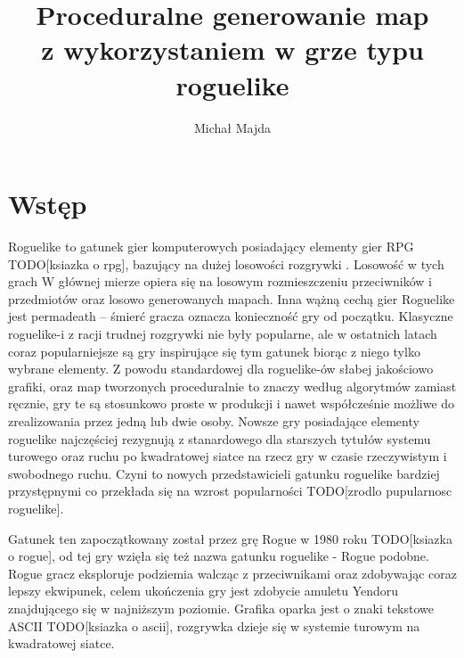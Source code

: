 \documentclass[12pt,twoside]{article}
\author{Michał Majda}
\title{Proceduralne generowanie map \\ z wykorzystaniem w grze typu roguelike }
\begin{document}
\maketitle

\blankpage
\tableofcontents
\clearpage
\blankpage


%

\section*{Wstęp}
Roguelike to gatunek gier komputerowych posiadający elementy gier RPG TODO[ksiazka o rpg], bazujący na dużej losowości rozgrywki \cite{bookroguelike}. Losowość w tych grach W głównej mierze opiera się na losowym rozmieszczeniu przeciwników i przedmiotów oraz losowo generowanych mapach. Inna wążną cechą gier Roguelike jest permadeath -- śmierć gracza oznacza konieczność gry od początku. Klasyczne roguelike-i z racji trudnej rozgrywki nie były popularne, ale w ostatnich latach coraz popularniejsze są gry inspirujące się tym gatunek biorąc z niego tylko wybrane elementy. Z powodu standardowej dla roguelike-ów słabej jakościowo grafiki, oraz map tworzonych proceduralnie to znaczy według algorytmów zamiast ręcznie, gry te są stosunkowo proste w produkcji i nawet współcześnie możliwe do zrealizowania przez jedną lub dwie osoby. Nowsze gry posiadające elementy roguelike najczęściej rezygnują z stanardowego dla starszych tytułów systemu turowego oraz ruchu po kwadratowej siatce na rzecz gry w czasie rzeczywistym i swobodnego ruchu. Czyni to nowych przedstawicieli gatunku roguelike bardziej przystępnymi co przekłada się na wzrost popularności TODO[zrodlo pupularnosc roguelike].

Gatunek ten zapoczątkowany został przez grę Rogue w 1980 roku TODO[ksiazka o rogue], od tej gry wzięła się też nazwa gatunku roguelike - Rogue podobne. Rogue gracz eksploruje podziemia walcząc z przeciwnikami oraz zdobywając coraz lepszy ekwipunek, celem ukończenia gry jest zdobycie amuletu Yendoru znajdującego się w najniższym poziomie. Grafika oparka jest o znaki tekstowe ASCII  TODO[ksiazka o ascii], rozgrywka dzieje się w systemie turowym na kwadratowej siatce.
\end{document}
